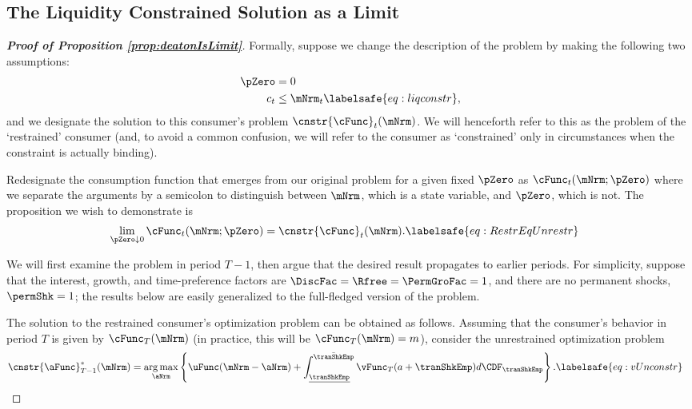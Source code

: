 \documentclass[\econtexRoot/BufferStockTheory]{subfiles}
\begin{document}
\subsection{The Liquidity Constrained Solution as a Limit}\label{sec:LiqConstrAsLimit}


\begin{proof}[\textbf{Proof of Proposition \ref{prop:deatonIsLimit}}]
Formally, suppose we change the description of the problem by making
the following two assumptions:
\begin{eqnarray*}
  \pZero   & = 0
  \\  c_{t} & \leq  \mNrm_{t} \labelsafe{eq:liqconstr},
\end{eqnarray*}
and we designate the solution to this consumer's problem $\cnstr{\cFunc}_{t}(\mNrm)$.
We will henceforth refer to this as the problem of the `restrained' consumer (and, to avoid a common confusion, we will refer to the consumer as `constrained' only in circumstances when the constraint is actually binding).

Redesignate the consumption function that emerges from our original problem for a given fixed $\pZero$ as $\cFunc_{t}(\mNrm;\pZero)$ where we separate the arguments by a semicolon to distinguish between $\mNrm$, which is a state variable, and $\pZero$, which is not.
The proposition we wish to demonstrate is
\begin{equation}\begin{gathered}\begin{aligned}
      \lim_{\pZero \downarrow 0} \cFunc_{t}(\mNrm;\pZero)  & = \cnstr{\cFunc}_{t}(\mNrm). \labelsafe{eq:RestrEqUnrestr} 
    \end{aligned}\end{gathered}\end{equation}

We will first examine the problem in period $T-1$, then argue that the desired result propagates to earlier periods.
For simplicity, suppose that the interest, growth, and time-preference factors are $\DiscFac = \Rfree = \PermGroFac = 1$, and there are no permanent shocks, $\permShk=1$; the results below are easily generalized to the full-fledged version of the problem.

The solution to the restrained consumer's optimization problem can be obtained as follows.
Assuming that the consumer's behavior in period $T$ is given by $\cFunc_{T}(\mNrm)$ (in practice, this will be $\cFunc_{T}(\mNrm)=m$), consider the unrestrained optimization problem
\begin{equation}\begin{gathered}\begin{aligned}
      \cnstr{\aFunc}^{*}_{T-1}(\mNrm)  & = \underset{\aNrm}{\arg \max} \left\{\uFunc(\mNrm-\aNrm) +  \int_{\underline{\tranShkEmp}}^{\bar{\tranShkEmp}} \vFunc_{T}(a+\tranShkEmp) d\CDF_{\tranShkEmp} \right\}. \labelsafe{eq:vUnconstr}
    \end{aligned}\end{gathered}\end{equation}


\end{proof}
\end{document}
